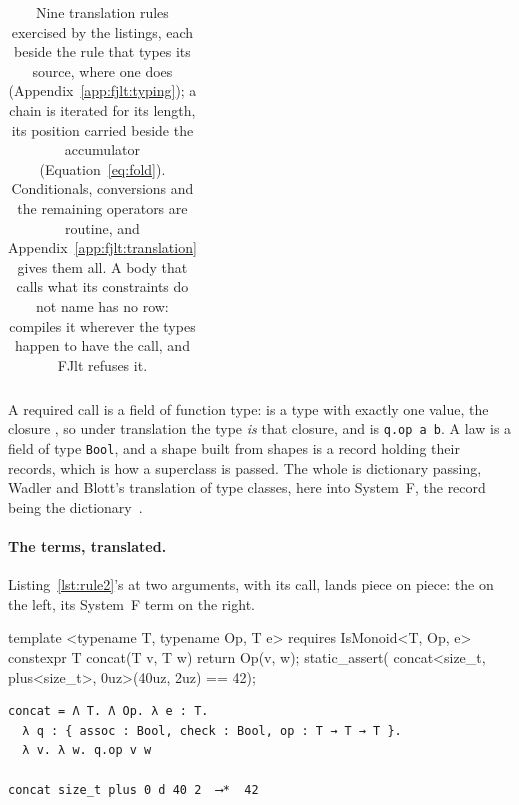 \begin{table}[ht]
\begin{tabularx}{\linewidth}{@{}>{\raggedright\arraybackslash}p{0.31\linewidth}>{\raggedright\arraybackslash}p{0.2\linewidth}>{\raggedright\arraybackslash}X>{\raggedright\arraybackslash}p{0.09\linewidth}@{}}
\bottomrule
\end{tabularx}
\caption{Nine translation rules exercised by the listings, each beside the rule that types its source, where one does (Appendix~\ref{app:fjlt:typing}); a chain is iterated for its length, its position carried beside the accumulator (Equation~\eqref{eq:fold}).
Conditionals, conversions and the remaining operators are routine, and Appendix~\ref{app:fjlt:translation} gives them all.
A body that calls what its constraints do not name has no row: \Cpp{} compiles it wherever the types happen to have the call, and FJlt refuses it.}
\label{tab:rules}
\end{table}

A required call is a field of function type:  is a type with exactly one value, the closure , so under translation the type \emph{is} that closure, and  is \texttt{q.op a b}.
A law is a field of type \texttt{Bool}, and a shape built from shapes is a record holding their records, which is how a superclass is passed.
The whole is dictionary passing, Wadler and Blott's translation of type classes, here into System~F, the record being the dictionary~\cite{wadler1989adhoc}.

\paragraph{The terms, translated.}
Listing~\ref{lst:rule2}'s  at two arguments, with its call, lands piece on piece: the \Cpp{} on the left, its System~F term on the right.

\noindent\begin{minipage}[t]{0.52\linewidth}
\begin{cpp}
template <typename T, typename Op, T e>
  requires IsMonoid<T, Op, e>
constexpr T concat(T v, T w) {
  return Op{}(v, w);
}
static_assert(
  concat<size_t, plus<size_t>, 0uz>(40uz, 2uz)
  == 42);
\end{cpp}
\end{minipage}\hfill
\begin{minipage}[t]{0.46\linewidth}
\begin{verbatim}
concat = Λ T. Λ Op. λ e : T.
  λ q : { assoc : Bool, check : Bool, op : T → T → T }.
  λ v. λ w. q.op v w

concat size_t plus 0 d 40 2  ⟶*  42
\end{verbatim}
\end{minipage}

